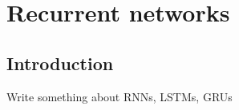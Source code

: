 \chapter{Recurrent networks}

\section{Introduction}\label{sec:i}
Write something about RNNs, LSTMs, GRUs



